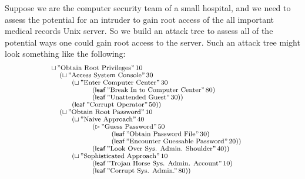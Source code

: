 \documentclass{sigplanconf}
\begin{document}
Suppose we are the computer security team of a small hospital, and we
need to assess the potential for an intruder to gain root access of the
all important medical records Unix server.  So we build an attack tree
to assess all of the potential ways one could gain root access to the
server.  Such an attack tree might look something like the following:
\[
\small
  \begin{array}{lll}
    \sqcup\,\text{''Obtain Root Privileges''}\,10\\
    \,\,\,\,\,\,\,(\sqcup\,\text{''Access System Console''}\,30\\
    \,\,\,\,\,\,\,\,\,\,\,\,\,\,\begin{array}{lll}
    (\sqcup\,\text{''Enter Computer Center''}\,30\\
    \,\,\,\,\,\,\,\,\,\,\,\,\,\,\begin{array}{lll}
    (\mathsf{leaf}\,\text{''Break In to Computer Center''}\,80)\\
    (\mathsf{leaf}\,\text{''Unattended Guest''}\,30))\\
    \end{array}\\
    (\mathsf{leaf}\,\text{''Corrupt Operator''}\,50))\\
    \end{array}\\
    \,\,\,\,\,\,\,(\sqcup\,\text{''Obtain Root Password''}\,10\\
    \,\,\,\,\,\,\,\,\,\,\,\,\,\,\begin{array}{lll}
    (\sqcup\,\text{''Naive Approach''}\,40\\
    \,\,\,\,\,\,\,\,\,\,\,\,\,\,\begin{array}{lll}
    (\rhd\,\text{''Guess Password''}\,50\\
    \,\,\,\,\,\,\,\,\,\,\,\,\,\begin{array}{lll}
    (\mathsf{leaf}\,\text{''Obtain Password File''}\,30)\\
    (\mathsf{leaf}\,\text{''Encounter Guessable Password''}\,20))\\
    \end{array}\\
    (\mathsf{leaf}\,\text{''Look Over Sys. Admin. Shoulder''}\,40))\\
    \end{array}\\
    (\sqcup\,\text{''Sophisticated Approach''}\,10\\
    \,\,\,\,\,\,\,\,\,\,\,\,\,\,\begin{array}{lll}
    (\mathsf{leaf}\,\text{''Trojan Horse Sys. Admin. Account''}\,10)\\
    (\mathsf{leaf}\,\text{''Corrupt Sys. Admin.''}\,80))\\
    \end{array}
    \end{array}
  \end{array}
\]
\end{document}
